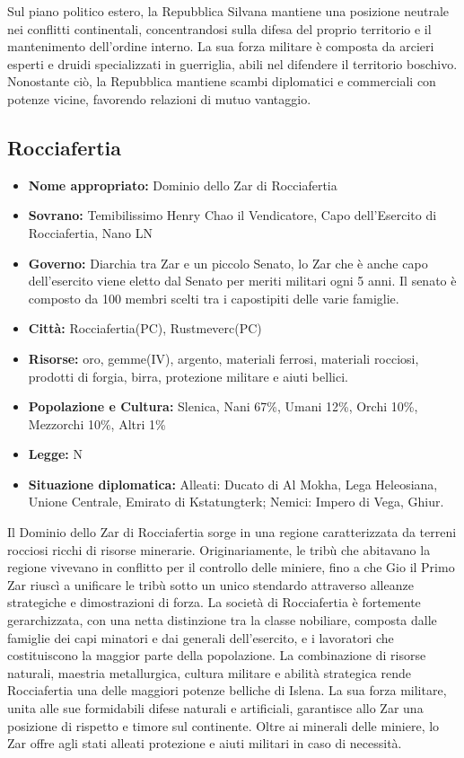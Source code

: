 \documentclass[10pt, a4paper]{report}
\begin{document}
\begin{multicols}{2}
Sul piano politico estero, la Repubblica Silvana mantiene una posizione neutrale nei conflitti continentali, concentrandosi sulla difesa del proprio territorio e il mantenimento dell’ordine interno. La sua forza militare è composta da arcieri esperti e druidi specializzati in guerriglia, abili nel difendere il territorio boschivo. Nonostante ciò, la Repubblica mantiene scambi diplomatici e commerciali con potenze vicine, favorendo relazioni di mutuo vantaggio.

\subsection*{Rocciafertia}
\begin{itemize}
	\item \textbf{Nome appropriato:} Dominio dello Zar di Rocciafertia
	\item \textbf{Sovrano:} Temibilissimo Henry Chao il Vendicatore, Capo dell'Esercito di Rocciafertia, Nano LN
	\item \textbf{Governo:} Diarchia tra Zar e un piccolo Senato, lo Zar che è anche capo dell'esercito viene eletto dal Senato per meriti militari ogni 5 anni. Il senato è composto da 100 membri scelti tra i capostipiti delle varie famiglie.
	\item \textbf{Città:} Rocciafertia(PC), Rustmeverc(PC)
	\item \textbf{Risorse:} oro, gemme(IV), argento, materiali ferrosi, materiali rocciosi, prodotti di forgia, birra, protezione militare e aiuti bellici.
	\item \textbf{Popolazione e Cultura:} Slenica, Nani 67\%, Umani 12\%, Orchi 10\%, Mezzorchi 10\%, Altri 1\%
	\item \textbf{Legge:} N
	\item \textbf{Situazione diplomatica:} Alleati: Ducato di Al Mokha, Lega Heleosiana, Unione Centrale, Emirato di Kstatungterk; Nemici: Impero di Vega, Ghiur.
\end{itemize}
Il Dominio dello Zar di Rocciafertia sorge in una regione caratterizzata da terreni rocciosi ricchi di risorse minerarie. Originariamente, le tribù che abitavano la regione vivevano in conflitto per il controllo delle miniere, fino a che Gio il Primo Zar riuscì a unificare le tribù sotto un unico stendardo attraverso alleanze strategiche e dimostrazioni di forza. 
La società di Rocciafertia è fortemente gerarchizzata, con una netta distinzione tra la classe nobiliare, composta dalle famiglie dei capi minatori e dai generali dell'esercito, e i lavoratori che costituiscono la maggior parte della popolazione. La combinazione di risorse naturali, maestria metallurgica, cultura militare e abilità strategica rende Rocciafertia una delle maggiori potenze belliche di Islena. La sua forza militare, unita alle sue formidabili difese naturali e artificiali, garantisce allo Zar una posizione di rispetto e timore sul continente. Oltre ai minerali delle miniere, lo Zar offre agli stati alleati protezione e aiuti militari in caso di necessità.


\end{multicols}
\end{document}
